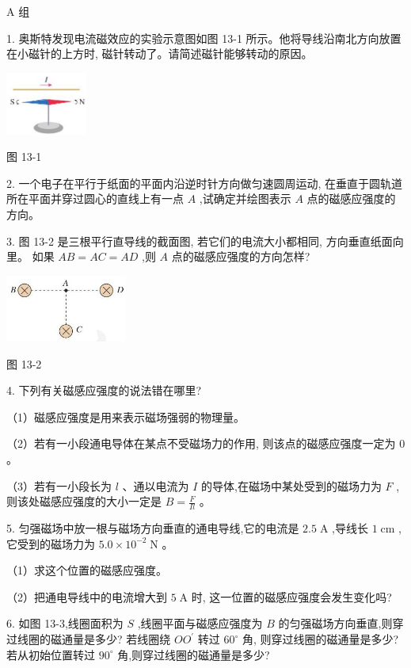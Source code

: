 \documentclass[10pt]{article}
\begin{document}
A 组

1. 奥斯特发现电流磁效应的实验示意图如图 13-1 所示。他将导线沿南北方向放置在小磁针的上方时, 磁针转动了。请简述磁针能够转动的原因。

\begin{center}
\includegraphics[max width=0.2\textwidth]{images/01911d5f-8e38-70c0-b5b8-2b399bd115b6_134_233123.jpg}
\end{center}

图 13-1

2. 一个电子在平行于纸面的平面内沿逆时针方向做匀速圆周运动, 在垂直于圆轨道所在平面并穿过圆心的直线上有一点 \(A\) ,试确定并绘图表示 \(A\) 点的磁感应强度的方向。

3. 图 13-2 是三根平行直导线的截面图, 若它们的电流大小都相同, 方向垂直纸面向里。 如果 \({AB} = {AC} = {AD}\) ,则 \(A\) 点的磁感应强度的方向怎样?

\begin{center}
\includegraphics[max width=0.3\textwidth]{images/01911d5f-8e38-70c0-b5b8-2b399bd115b6_134_286171.jpg}
\end{center}

图 13-2

4. 下列有关磁感应强度的说法错在哪里?

（1）磁感应强度是用来表示磁场强弱的物理量。

（2）若有一小段通电导体在某点不受磁场力的作用, 则该点的磁感应强度一定为 0 。

（3）若有一小段长为 \(l\) 、通以电流为 \(I\) 的导体,在磁场中某处受到的磁场力为 \(F\) ,则该处磁感应强度的大小一定是 \(B = \frac{F}{Il}\) 。

5. 匀强磁场中放一根与磁场方向垂直的通电导线,它的电流是 \({2.5}\mathrm{\;A}\) ,导线长 \(1\mathrm{\;{cm}}\) ,它受到的磁场力为 \({5.0} \times {10}^{-2}\mathrm{\;N}\) 。

（1）求这个位置的磁感应强度。

（2）把通电导线中的电流增大到 \(5\mathrm{\;A}\) 时, 这一位置的磁感应强度会发生变化吗?

6. 如图 13-3,线圈面积为 \(S\) ,线圈平面与磁感应强度为 \(B\) 的匀强磁场方向垂直,则穿过线圈的磁通量是多少? 若线圈绕 \(O{O}^{\prime }\) 转过 \({60}^{ \circ }\) 角, 则穿过线圈的磁通量是多少? 若从初始位置转过 \({90}^{ \circ }\) 角,则穿过线圈的磁通量是多少?
\end{document}
